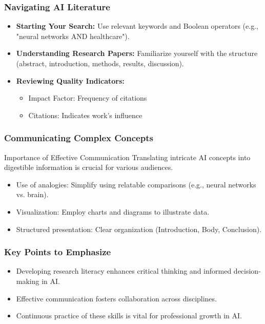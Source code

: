 \documentclass{beamer}
\begin{document}
\begin{frame}[fragile]
    \frametitle{Navigating AI Literature}
    \begin{itemize}
        \item \textbf{Starting Your Search:} Use relevant keywords and Boolean operators (e.g., "neural networks AND healthcare").
        
        \item \textbf{Understanding Research Papers:} Familiarize yourself with the structure (abstract, introduction, methods, results, discussion).
        
        \item \textbf{Reviewing Quality Indicators:}
        \begin{itemize}
            \item Impact Factor: Frequency of citations
            \item Citations: Indicates work's influence
        \end{itemize}
    \end{itemize}
\end{frame}

\begin{frame}[fragile]
    \frametitle{Communicating Complex Concepts}
    \begin{block}{Importance of Effective Communication}
        Translating intricate AI concepts into digestible information is crucial for various audiences.
    \end{block}

    \begin{itemize}
        \item Use of analogies: Simplify using relatable comparisons (e.g., neural networks vs. brain).
        \item Visualization: Employ charts and diagrams to illustrate data.
        \item Structured presentation: Clear organization (Introduction, Body, Conclusion).
    \end{itemize}
\end{frame}

\begin{frame}[fragile]
    \frametitle{Key Points to Emphasize}
    \begin{itemize}
        \item Developing research literacy enhances critical thinking and informed decision-making in AI.
        \item Effective communication fosters collaboration across disciplines.
        \item Continuous practice of these skills is vital for professional growth in AI.
    \end{itemize}
\end{frame}
\end{document}

